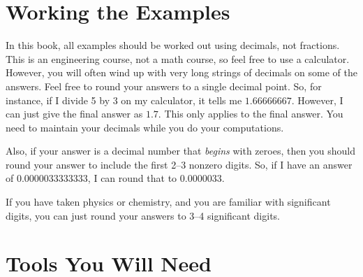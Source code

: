 \section{Working the Examples}

In this book, all examples should be worked out using decimals, not fractions.
This is an engineering course, not a math course, so feel free to use a calculator.
However, you will often wind up with very long strings of decimals on some of the answers.
Feel free to round your answers to a single decimal point.
So, for instance, if I divide 5 by 3 on my calculator, it tells me $1.66666667$.
However, I can just give the final answer as $1.7$.
This only applies to the final answer.  
You need to maintain your decimals while you do your computations.

Also, if your answer is a decimal number that \emph{begins} with zeroes, then you should round your answer to include the first 2--3 nonzero digits.
So, if I have an answer of $0.0000033333333$, I can round that to $0.0000033$.

If you have taken physics or chemistry, and you are familiar with significant digits, you can just round your answers to 3--4 significant digits.

\section{Tools You Will Need}

